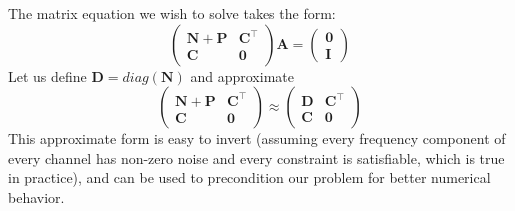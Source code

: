 The matrix equation we wish to solve takes the form:
\begin{equation}\begin{pmatrix}
\mathbf{N}+\mathbf{P} & \mathbf{C}^\top\\
\mathbf{C} & \mathbf{0}
\end{pmatrix}
\mathbf{A} = 
\begin{pmatrix}
\mathbf{0} \\ \mathbf{I}
\end{pmatrix}\end{equation}
Let us define $\mathbf{D} = diag(\mathbf{N})$ and approximate
\begin{equation}\begin{pmatrix}
\mathbf{N}+\mathbf{P} & \mathbf{C}^\top\\
\mathbf{C} & \mathbf{0}
\end{pmatrix}
\approx
\begin{pmatrix}
\mathbf{D} & \mathbf{C}^\top \\
\mathbf{C} & \mathbf{0}
\end{pmatrix}\end{equation}
This approximate form is easy to invert (assuming every frequency component of every channel has non-zero noise and every constraint is satisfiable, which is true in practice), and can be used to precondition our problem for better numerical behavior.

